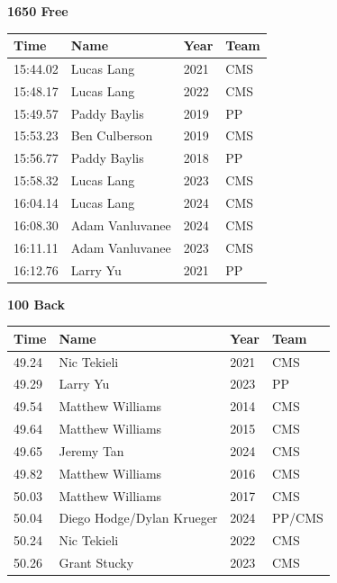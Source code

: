 \vspace{1.2em}
\noindent\begin{minipage}[t]{0.98\textwidth}
\centering
\textbf{\textcolor{teamprimary}{1650 Free}}\par
\vspace{0.5em}
\centering
\small
\renewcommand{\arraystretch}{1.0}
\setlength{\tabcolsep}{4pt}
\begin{tabular}{@{}p{2.5cm}p{4.5cm}p{1.5cm}p{2.5cm}@{}}
\toprule
\textbf{Time} & \textbf{Name} & \textbf{Year} & \textbf{Team} \\
\midrule
15:44.02 & Lucas Lang & 2021 & CMS \\
15:48.17 & Lucas Lang & 2022 & CMS \\
15:49.57 & Paddy Baylis & 2019 & PP \\
15:53.23 & Ben Culberson & 2019 & CMS \\
15:56.77 & Paddy Baylis & 2018 & PP \\
15:58.32 & Lucas Lang & 2023 & CMS \\
16:04.14 & Lucas Lang & 2024 & CMS \\
16:08.30 & Adam Vanluvanee & 2024 & CMS \\
16:11.11 & Adam Vanluvanee & 2023 & CMS \\
16:12.76 & Larry Yu & 2021 & PP \\
\bottomrule
\end{tabular}
\end{minipage}
\vspace{1.2em}
\noindent\begin{minipage}[t]{0.98\textwidth}
\centering
\textbf{\textcolor{teamprimary}{100 Back}}\par
\vspace{0.5em}
\centering
\small
\renewcommand{\arraystretch}{1.0}
\setlength{\tabcolsep}{4pt}
\begin{tabular}{@{}p{2.5cm}p{4.5cm}p{1.5cm}p{2.5cm}@{}}
\toprule
\textbf{Time} & \textbf{Name} & \textbf{Year} & \textbf{Team} \\
\midrule
49.24 & Nic Tekieli & 2021 & CMS \\
49.29 & Larry Yu & 2023 & PP \\
49.54 & Matthew Williams & 2014 & CMS \\
49.64 & Matthew Williams & 2015 & CMS \\
49.65 & Jeremy Tan & 2024 & CMS \\
49.82 & Matthew Williams & 2016 & CMS \\
50.03 & Matthew Williams & 2017 & CMS \\
50.04 & Diego Hodge/Dylan Krueger & 2024 & PP/CMS \\
50.24 & Nic Tekieli & 2022 & CMS \\
50.26 & Grant Stucky & 2023 & CMS \\
\bottomrule
\end{tabular}
\end{minipage}
